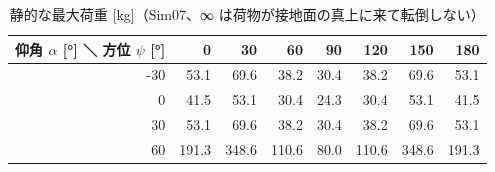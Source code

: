 \begin{longtable}{rrrrrrrr}
\caption{静的な最大荷重 [kg]（Sim07、∞ は荷物が接地面の真上に来て転倒しない）}\\
\toprule
仰角 $\alpha$ [°] ＼ 方位 $\psi$ [°] & 0 & 30 & 60 & 90 & 120 & 150 & 180 \\ \midrule \endhead
-30 & 53.1 & 69.6 & 38.2 & 30.4 & 38.2 & 69.6 & 53.1 \\
0 & 41.5 & 53.1 & 30.4 & 24.3 & 30.4 & 53.1 & 41.5 \\
30 & 53.1 & 69.6 & 38.2 & 30.4 & 38.2 & 69.6 & 53.1 \\
60 & 191.3 & 348.6 & 110.6 & 80.0 & 110.6 & 348.6 & 191.3 \\
\bottomrule
\end{longtable}
